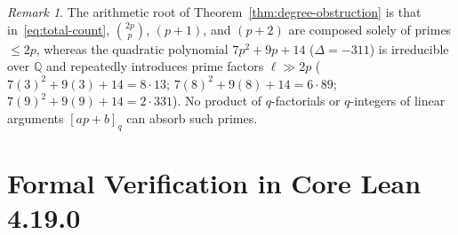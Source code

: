 \documentclass[11pt,a4paper]{article}
\theoremstyle{definition}
\theoremstyle{remark}
\newtheorem{remark}[theorem]{Remark}
\begin{document}
\begin{remark}
The arithmetic root of Theorem~\ref{thm:degree-obstruction} is that in~\eqref{eq:total-count}, $\binom{2p}{p}$, $(p+1)$, and $(p+2)$ are composed solely of primes $\le 2p$, whereas the quadratic polynomial $7p^2 + 9p + 14$ ($\Delta = -311$) is irreducible over $\mathbb{Q}$ and repeatedly introduces prime factors $\ell \gg 2p$ ($7(3)^2 + 9(3) + 14 = 8 \cdot 13$; $7(8)^2 + 9(8) + 14 = 6 \cdot 89$; $7(9)^2 + 9(9) + 14 = 2 \cdot 331$). No product of $q$-factorials or $q$-integers of linear arguments $[ap+b]_q$ can absorb such primes.
\end{remark}

\section{Formal Verification in Core Lean 4.19.0}
\end{document}
